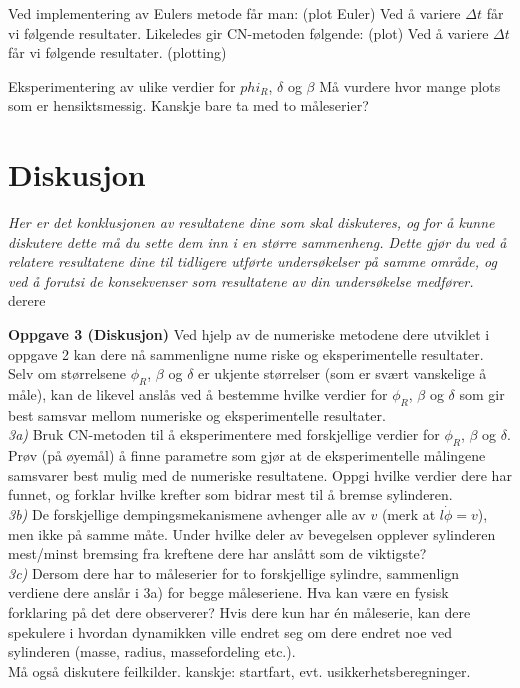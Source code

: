 \documentclass[5p]{elsarticle}
\begin{document}
Ved implementering av Eulers metode får man: (plot Euler)
Ved å variere \(\Delta t\) får vi følgende resultater.
Likeledes gir CN-metoden følgende: (plot)
Ved å variere \(\Delta t\) får vi følgende resultater.
(plotting)

Eksperimentering av ulike verdier for \(phi_R\), \(\delta\) og \(\beta\)
Må vurdere hvor mange plots som er hensiktsmessig. Kanskje bare ta med to måleserier?


\section{Diskusjon}
\textit{Her er det konklusjonen av resultatene dine som skal diskuteres, og
for å kunne diskutere dette må du sette dem inn i en større
sammenheng. Dette gjør du ved å relatere resultatene dine til
tidligere utførte undersøkelser på samme område, og ved å forutsi de
konsekvenser som resultatene av din undersøkelse medfører.}
derere

\textbf{Oppgave 3 (Diskusjon)}
Ved hjelp av de numeriske metodene dere utviklet i oppgave 2 kan dere nå sammenligne nume
riske og eksperimentelle resultater. Selv om størrelsene \(\phi_R\), \(\beta\) og \(\delta\) er ukjente størrelser (som er
svært vanskelige å måle), kan de likevel anslås ved å bestemme hvilke verdier for \(\phi_R\), \(\beta\) og \(\delta\) som
gir best samsvar mellom numeriske og eksperimentelle resultater.
\\\textit{3a)} Bruk CN-metoden til å eksperimentere med forskjellige verdier for \(\phi_R\), \(\beta\) og \(\delta\). Prøv (på
øyemål) å finne parametre som gjør at de eksperimentelle målingene samsvarer best mulig med
de numeriske resultatene. Oppgi hvilke verdier dere har funnet, og forklar hvilke krefter som
bidrar mest til å bremse sylinderen.
\\\textit{3b)} De forskjellige dempingsmekanismene avhenger alle av \(v\) (merk at \(l\dot{\phi} = v\)), men ikke på
samme måte. Under hvilke deler av bevegelsen opplever sylinderen mest/minst bremsing fra
kreftene dere har anslått som de viktigste?
\\\textit{3c)} Dersom dere har to måleserier for to forskjellige sylindre, sammenlign verdiene dere anslår
i 3a) for begge måleseriene. Hva kan være en fysisk forklaring på det dere observerer? Hvis dere
kun har én måleserie, kan dere spekulere i hvordan dynamikken ville endret seg om dere endret
noe ved sylinderen (masse, radius, massefordeling etc.).
\\Må også diskutere feilkilder. kanskje: startfart, evt. usikkerhetsberegninger.
\end{document}
